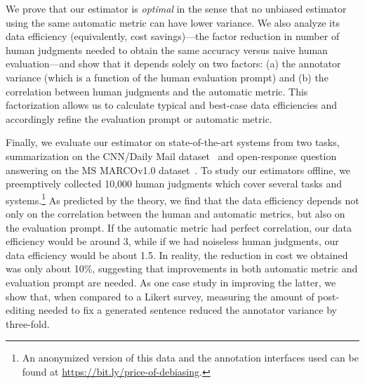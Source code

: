 We prove that our estimator is \emph{optimal} in the sense
that no unbiased estimator using the same automatic metric can have lower variance.
We also analyze its data efficiency (equivalently, cost savings)---the factor reduction in number of human judgments needed to obtain the same accuracy versus naive human evaluation---and show that it depends solely on
two factors:
  (a) the annotator variance (which is a function of the human evaluation prompt) and
  (b) the correlation between human judgments and the automatic metric.
This factorization allows us to calculate typical and best-case data efficiencies and accordingly refine the evaluation prompt or automatic metric.

Finally, we evaluate our estimator on state-of-the-art systems from two tasks, summarization on the CNN/Daily Mail dataset~\cite{hermann2015read,nallapati2016abstractive}
and open-response question answering on the MS MARCOv1.0 dataset~\citep{nguyen2016ms}.
To study our estimators offline,
we preemptively collected 10,000 human judgments which cover several tasks and systems.\footnote{%
An anonymized version of this data and the annotation interfaces used can be found at \url{https://bit.ly/price-of-debiasing}.}
As predicted by the theory, we find that the data efficiency depends not only on the correlation between the human and automatic metrics,
but also on the evaluation prompt.
If the automatic metric had perfect correlation, our data efficiency would be around 3, while
  if we had noiseless human judgments, our data efficiency would be about 1.5.
In reality, the reduction in cost we obtained was only about 10\%,
suggesting that improvements in both automatic metric and evaluation prompt are needed.
As one case study in improving the latter, we show that, when compared to a Likert survey, measuring the amount of post-editing needed to fix a generated sentence
reduced the annotator variance by three-fold.

